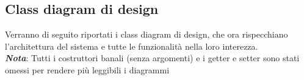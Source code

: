 \subsection{Class diagram di design}
    \begin{flushleft}
        Verranno di seguito riportati i class diagram di design, che ora rispecchiano l'architettura del sistema e tutte le funzionalità nella loro
        interezza. \\
        \emph{\textbf{Nota}}: Tutti i costruttori banali (senza argomenti) e i getter e setter sono stati omessi per rendere più leggibili 
        i diagrammi
    \end{flushleft}


